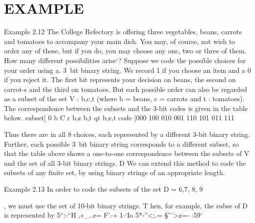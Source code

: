 {{{%
\section{EXAMPLE}
Example 2.12 The College Refectory is offering three vegetables, beans, carrots and tomatoes to
accompany your main dish. You may, of course, not wish to order any of these, but if you do, you
may choose any onc, two or three of them. How many different possibilities arise‘?
Suppose we code the possible choices for your order using a. 3~bit binary string. We record 1 if you
choose an item and a 0 if you reject it. The ﬁrst bit represents your decision on beans, the second
on carrot-s and the third on tomatoes. But each possible order can also be regarded as a subset
of the set V : {b,c,t} (where b = beans, c = carrots and t : tomatoes). The correspondence
between the subsets and the 3-bit codes is given in the table below.
subset] 0 {b} {C} {r} {b,¢} {b,t} {qt} {b,¢,t}
code |000 100 010 001 110 101 011 111

Thus there are in all 8 choices, each represented by a different 3-bit binary string. Further, each
possible 3~bit binary string corresponds to a different subset, so that the table above shows a
one-to-one correspondence between the subsets of V and the set of all 3-bit binary strings. D
We can extend this method to code the subsets of any ﬁnite set, by using binary strings of an
appropriate length.
\smallskip 
\smallskip 


Example 2.13 In order to code the subsets of the set D = 6,7, 8, 9}, we must use
the set of 10-bit binary strings. T hen, for example, the subse of D is represented by
5“:-“H
,»_..¢=
F’.-»
1-‘Io
5*-”<;.=
§”'>z=-
:59‘

}}
